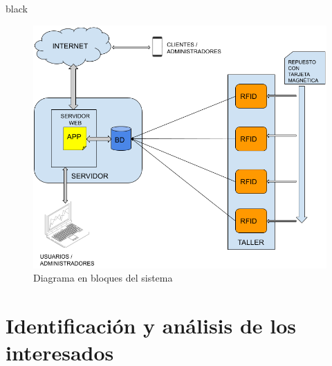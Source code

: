 \documentclass[11pt]{charter}
\begin{document}
\begin{consigna}{black}
\vspace{25px}

\begin{figure}[htpb]
\centering 
\includegraphics[width=.9\textwidth]{./Figuras/diagBloques.png}
\caption{Diagrama en bloques del sistema}
\label{fig:diagBloques}
\end{figure}

\vspace{25px}

\end{consigna}


\section{Identificación y análisis de los interesados}
\label{sec:interesados}
\end{document}
